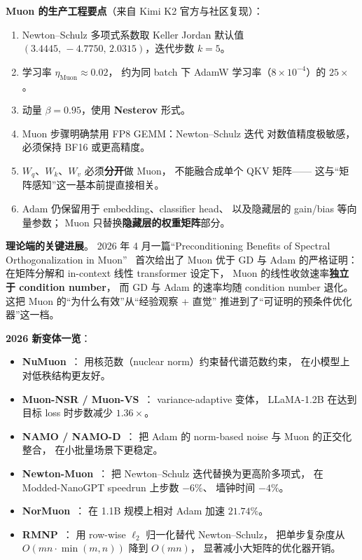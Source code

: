 \textbf{Muon 的生产工程要点}（来自 Kimi K2 官方与社区复现）：
\begin{enumerate}[noitemsep]
  \item Newton--Schulz 多项式系数取 Keller Jordan 默认值
        $(3.4445,\,-4.7750,\,2.0315)$，迭代步数 $k = 5$。
  \item 学习率 $\eta_{\text{Muon}} \approx 0.02$，
        约为同 batch 下 AdamW 学习率（$8 \times 10^{-4}$）的 $25\times$。
  \item 动量 $\beta = 0.95$，使用 \textbf{Nesterov} 形式。
  \item Muon 步骤明确禁用 FP8 GEMM：Newton--Schulz 迭代
        对数值精度极敏感，必须保持 BF16 或更高精度。
  \item $W_q$、$W_k$、$W_v$ 必须\textbf{分开}做 Muon，
        不能融合成单个 QKV 矩阵——
        这与“矩阵感知”这一基本前提直接相关。
  \item Adam 仍保留用于 embedding、classifier head、
        以及隐藏层的 gain/bias 等向量参数；
        Muon 只替换\textbf{隐藏层的权重矩阵}部分。
\end{enumerate}

\textbf{理论端的关键进展}。
2026 年 4 月一篇“Preconditioning Benefits of Spectral
Orthogonalization in Muon”~\cite{spectra_muon2026}
首次给出了 Muon 优于 GD 与 Adam 的严格证明：
在矩阵分解和 in-context 线性 transformer 设定下，
Muon 的线性收敛速率\textbf{独立于 condition number}，
而 GD 与 Adam 的速率均随 condition number 退化。
这把 Muon 的“为什么有效”从“经验观察 + 直觉”
推进到了“可证明的预条件优化器”这一档。

\textbf{2026 新变体一览}：
\begin{itemize}[noitemsep]
  \item \textbf{NuMuon}~\cite{numuon2026}：
        用核范数（nuclear norm）约束替代谱范数约束，
        在小模型上对低秩结构更友好。
  \item \textbf{Muon-NSR / Muon-VS}~\cite{muonvs2026}：
        variance-adaptive 变体，
        LLaMA-1.2B 在达到目标 loss 时步数减少 $1.36\times$。
  \item \textbf{NAMO / NAMO-D}~\cite{namo2026}：
        把 Adam 的 norm-based noise 与 Muon 的正交化整合，
        在小批量场景下更稳定。
  \item \textbf{Newton-Muon}~\cite{newtonmuon2026}：
        把 Newton--Schulz 迭代替换为更高阶多项式，
        在 Modded-NanoGPT speedrun 上步数 $-6\%$、
        墙钟时间 $-4\%$。
  \item \textbf{NorMuon}~\cite{normuon2026}：
        在 1.1B 规模上相对 Adam 加速 $21.74\%$。
  \item \textbf{RMNP}~\cite{rmnp2026}：
        用 row-wise $\ell_2$ 归一化替代 Newton--Schulz，
        把单步复杂度从 $O(mn \cdot \min(m,n))$ 降到 $O(mn)$，
        显著减小大矩阵的优化器开销。
\end{itemize}

